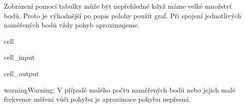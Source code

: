 \documentclass[letterpaper,10pt,english]{jupyterBook}
\begin{document}
\sphinxAtStartPar
Zobrazení pomocí tabulky může být nepřehledné když máme velké množství bodů. Proto je výhodnější po popis polohy použít graf. Při spojení jednotlivých naměřených bodů vždy pohyb aproximujeme.

\begin{sphinxuseclass}{cell}\begin{sphinxVerbatimInput}

\begin{sphinxuseclass}{cell_input}
\begin{sphinxVerbatim}[commandchars=\\\{\}]
  \PYG{p}{[}\PYG{p}{]}
  \PYG{p}{[}\PYG{p}{]}

  
  
\end{sphinxVerbatim}

\end{sphinxuseclass}\end{sphinxVerbatimInput}
\begin{sphinxVerbatimOutput}

\begin{sphinxuseclass}{cell_output}
\noindent{}

\end{sphinxuseclass}\end{sphinxVerbatimOutput}

\end{sphinxuseclass}
\begin{sphinxadmonition}{warning}{Warning:}
\sphinxAtStartPar
V případě malého počtu naměřených bodů nebo jejich malé frekvence měření vůči pohybu je aproximace pohybu nepřesná.
\end{sphinxadmonition}
\end{document}
